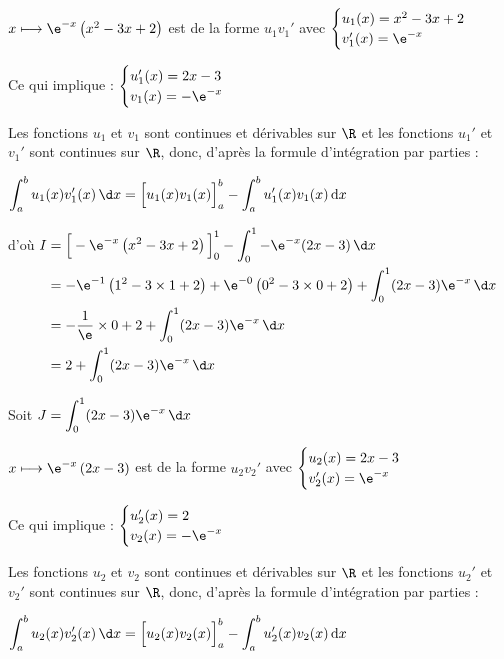 \begin{enumerate}
\begin{enumerate}
			$x \longmapsto \e^{-x}\left(x^{2}-3 x+2\right) $ \quad est de la forme $u_1 v_1'$ avec \quad $\begin{cases}u_1(x)=x^{2}-3 x+2 \\ v_1'(x)= \e^{-x}\end{cases}$

			Ce qui implique : \quad $\begin{cases}u_1'(x)=2x-3 \\v_1(x)=-\e^{-x} \end{cases}$

			Les fonctions $u_1$ et $v_1$ sont continues et dérivables sur $\R$ et les fonctions $u_1'$ et $v_1'$ sont continues sur $\R$, donc, d'après la formule d'intégration par parties :

			$\displaystyle \int_{a}^{b} u_1(x)v_1'(x)\,    \d x= \Big [ u_1(x)v_1(x)\strut\Big]_{a}^{b} - \int_{a}^{b} u_1'(x)v_1(x) \, \mathrm{d}x$\

			d'où $
			\begin{aligned}[t]
				I & =\Big[ -\e^{-x}\left(x^{2}-3 x+2\right)   \Big]_0^{1}-\int_0^{1}   -\e^{-x}(2x-3) \,    \d x\\
				& =   -\e^{-1}\left(1^{2}-3 \times 1+2\right) + \e^{-0}\left(0^{2}-3 \times 0+2\right)    +\int_0^{1}(2x-3)\e^{-x}\,    \d x\\
				& =   -\dfrac{1}{\e} \times 0 +2 +\int_0^{1}(2x-3)\e^{-x}\,    \d x\\
				& =  2 +\int_0^{1}(2x-3)\e^{-x}\,    \d x
			\end{aligned}	$


			Soit $\displaystyle J= \int_0^{1}(2x-3)\e^{-x}\, \d x $

			$x \longmapsto \e^{-x}\left(2 x-3\right) $ \quad est de la forme $u_2 v_2'$ avec \quad $\begin{cases}u_2(x)=2x-3 \\ v_2'(x)= \e^{-x}\end{cases}$

			Ce qui implique : \quad $\begin{cases}u_2'(x)=2 \\v_2(x)=-\e^{-x} \end{cases}$

			Les fonctions $u_2$ et $v_2$ sont continues et dérivables sur $\R$ et les fonctions $u_2'$ et $v_2'$ sont continues sur $\R$, donc, d'après la formule d'intégration par parties :

			$\displaystyle \int_{a}^{b} u_2(x)v_2'(x)\,    \d x= \Big [ u_2(x)v_2(x)\strut\Big]_{a}^{b} - \int_{a}^{b} u_2'(x)v_2(x) \, \mathrm{d}x$\


\end{enumerate}
\end{enumerate}
